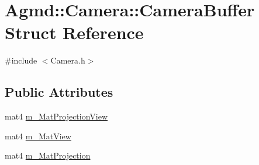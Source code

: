 \hypertarget{struct_agmd_1_1_camera_1_1_camera_buffer}{\section{Agmd\+:\+:Camera\+:\+:Camera\+Buffer Struct Reference}
\label{struct_agmd_1_1_camera_1_1_camera_buffer}
}


{\ttfamily \#include $<$Camera.\+h$>$}

\subsection*{Public Attributes}
\begin{DoxyCompactItemize}
\item 
mat4 \hyperlink{struct_agmd_1_1_camera_1_1_camera_buffer_a769a05a664a5af59588a9d355e992ab8}{m\+\_\+\+Mat\+Projection\+View}
\item 
mat4 \hyperlink{struct_agmd_1_1_camera_1_1_camera_buffer_a0780ddb41b5b6d832793e68af2e901ed}{m\+\_\+\+Mat\+View}
\item 
mat4 \hyperlink{struct_agmd_1_1_camera_1_1_camera_buffer_a677849c6b4e154b74d36ee8dc23f2702}{m\+\_\+\+Mat\+Projection}
\end{DoxyCompactItemize}


